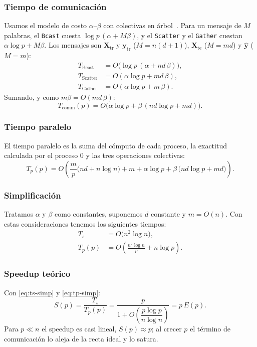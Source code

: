 \documentclass[11pt,a4paper]{article}
\newcommand{\ntr}{n}   %
\newcommand{\mte}{m}   %
\newcommand{\Xtr}{\mathbf{X}_{\text{tr}}}
\newcommand{\Xte}{\mathbf{X}_{\text{te}}}
\newcommand{\ytr}{\mathbf{y}_{\text{tr}}}
\newcommand{\yhat}{\hat{\mathbf{y}}}
\newcommand{\Tcomm}{T_{\text{comm}}}
\begin{document}
\subsubsection{Tiempo de comunicación}
Usamos el modelo de costo $\alpha$--$\beta$ con colectivas en árbol~\cite{fiestasU2}. Para un mensaje
de $M$ palabras, el \texttt{Bcast} cuesta $\log p\,(\alpha+M\beta)$, y el \texttt{Scatter} y el
\texttt{Gather} cuestan $\alpha\log p+M\beta$. Los mensajes son $\Xtr$ y $\ytr$ ($M=n(d+1)$), $\Xte$
($M=md$) y $\yhat$ ($M=m$):
\begin{align}
  T_{\text{Bcast}}   &=O\big(\log p\,(\alpha+nd\,\beta)\big),\label{eq:tbcast}\\
  T_{\text{Scatter}} &=O(\alpha\log p+md\,\beta),\label{eq:tscatter}\\
  T_{\text{Gather}}  &=O(\alpha\log p+m\,\beta).\label{eq:tgather}
\end{align}
Sumando, y como $m\beta=O(md\,\beta)$:
\begin{equation}
  \Tcomm(p)=O\big(\alpha\log p+\beta\,(nd\log p+md)\big).\label{eq:tcomm}
\end{equation}

\subsubsection{Tiempo paralelo}
El tiempo paralelo es la suma del cómputo de cada proceso, la exactitud calculada por el proceso
$0$ y las tres operaciones colectivas:
\begin{equation}
  T_p(p)=O\!\left(\frac{\mte}{p}\big(\ntr d+\ntr\log\ntr\big)+\mte+\alpha\log p
  +\beta\,\big(\ntr d\log p+\mte d\big)\right).\label{eq:tp}
\end{equation}

\subsubsection{Simplificación}
Tratamos $\alpha$ y $\beta$ como constantes, suponemos $d$ constante y $\mte=O(\ntr)$. Con estas
consideraciones tenemos los siguientes tiempos:
\begin{align}
  T_s    &=O\big(\ntr^2\log\ntr\big),\label{eq:ts-simp}\\
  T_p(p) &=O\!\left(\frac{\ntr^2\log\ntr}{p}+\ntr\log p\right).\label{eq:tp-simp}
\end{align}

\subsubsection{Speedup teórico}
Con \eqref{eq:ts-simp} y \eqref{eq:tp-simp}:
\begin{equation}
  S(p)=\frac{T_s}{T_p(p)}
  =\frac{p}{1+O\!\left(\dfrac{p\log p}{\ntr\log\ntr}\right)}=p\,E(p).\label{eq:speedup}
\end{equation}
Para $p\ll\ntr$ el speedup es casi lineal, $S(p)\approx p$; al crecer $p$ el término de
comunicación lo aleja de la recta ideal y lo satura.
\end{document}
